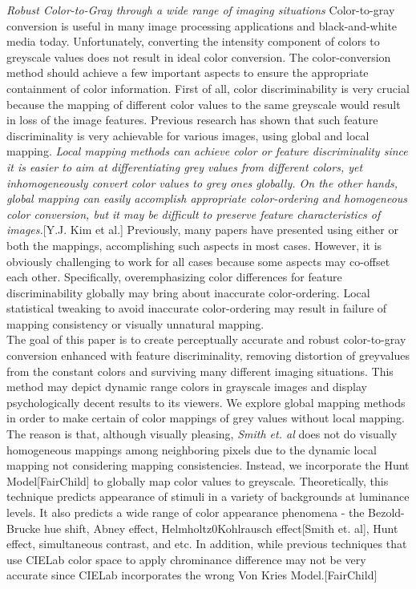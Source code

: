 \documentclass{article}
\begin{document}
{\it Robust Color-to-Gray through a wide range of imaging situations}
Color-to-gray conversion is useful in many image processing applications and black-and-white media today. Unfortunately, converting the intensity component of colors to greyscale values does not result in ideal color conversion. The color-conversion method should achieve a few important aspects to ensure the appropriate containment of color information. First of all, color discriminability is very crucial because the mapping of different color values to the same greyscale would result in loss of the image features. Previous research has shown that such feature discriminality is very achievable for various images, using global and local mapping. {\it Local mapping methods can achieve color or feature discriminality since it is easier to aim at differentiating grey values from different colors, yet inhomogeneously convert color values to grey ones globally. On the other hands, global mapping can easily accomplish appropriate color-ordering and homogeneous color conversion, but it may be difficult to preserve feature characteristics of images.}[Y.J. Kim et al.] Previously, many papers have presented using either or both the mappings, accomplishing such aspects in most cases. However, it is obviously challenging to work for all cases because some aspects may co-offset each other. Specifically, overemphasizing color differences for feature discriminability globally may bring about inaccurate color-ordering. Local statistical tweaking to avoid inaccurate color-ordering may result in failure of mapping consistency or visually unnatural mapping.\\
The goal of this paper is to create perceptually accurate and robust color-to-gray conversion enhanced with feature discriminality, removing distortion of greyvalues from the constant colors and surviving many different imaging situations. This method may depict dynamic range colors in grayscale images and display psychologically decent results to its viewers. We explore global mapping methods in order to make certain of color mappings of grey values without local mapping. The reason is that, although visually pleasing, {\it Smith et. al} does not do visually homogeneous mappings among neighboring pixels due to the dynamic local mapping not considering mapping consistencies. Instead, we incorporate the Hunt Model[FairChild] to globally map color values to greyscale. Theoretically, this technique predicts appearance of stimuli in a variety of backgrounds at luminance levels. It also predicts a wide range of color appearance phenomena - the Bezold-Brucke hue shift, Abney effect, Helmholtz0Kohlrausch effect[Smith et. al], Hunt effect, simultaneous contrast, and etc. In addition, while previous techniques that use CIELab color space to apply chrominance difference may not be very accurate since CIELab incorporates the wrong Von Kries Model.[FairChild]\\
\end{document}
